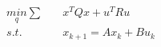 \documentclass[preview]{standalone}
\begin{document}
\begin{align*}
\underset{q}{min} \sum \quad &x^TQx + u^T R u \\ s.t. \quad &x_{k+1} = Ax_k + Bu_k
\end{align*}
\end{document}
